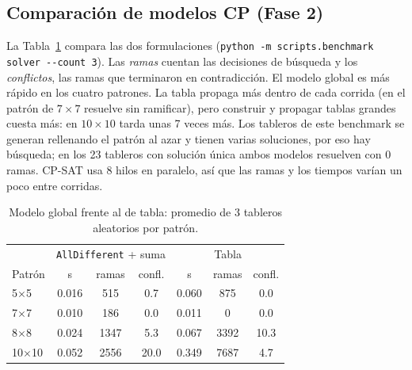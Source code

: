 \documentclass[conference,a4paper]{IEEEtran}
\begin{document}
\subsection{Comparación de modelos CP (Fase 2)}
La Tabla~\ref{tab:solver} compara las dos formulaciones (\texttt{python -m scripts.benchmark solver -{}-count 3}). Las \emph{ramas} cuentan las decisiones de búsqueda y los \emph{conflictos},
las ramas que terminaron en contradicción. El modelo global es más rápido en los cuatro patrones. La tabla propaga más dentro de cada
corrida (en el patrón de $7\times7$ resuelve sin ramificar), pero construir y propagar tablas grandes cuesta más: en $10\times10$ tarda
unas 7 veces más. Los tableros de este benchmark se generan rellenando el patrón al azar y tienen varias soluciones, por eso hay
búsqueda; en los 23 tableros con solución única ambos modelos resuelven con 0 ramas. CP-SAT usa 8 hilos en paralelo, así que las ramas
y los tiempos varían un poco entre corridas.

\begin{table}[!t]\centering
\caption{Modelo global frente al de tabla: promedio de 3 tableros aleatorios por patrón.}
\label{tab:solver}
\begin{tabular}{lcccccc}\toprule
 & \multicolumn{3}{c}{\texttt{AllDifferent} + suma} & \multicolumn{3}{c}{Tabla}\\
Patrón & s & ramas & confl. & s & ramas & confl.\\\midrule
5$\times$5 & 0.016 & 515 & 0.7 & 0.060 & 875 & 0.0\\
7$\times$7 & 0.010 & 186 & 0.0 & 0.011 & 0 & 0.0\\
8$\times$8 & 0.024 & 1347 & 5.3 & 0.067 & 3392 & 10.3\\
10$\times$10 & 0.052 & 2556 & 20.0 & 0.349 & 7687 & 4.7\\\bottomrule
\end{tabular}
\end{table}
\end{document}
